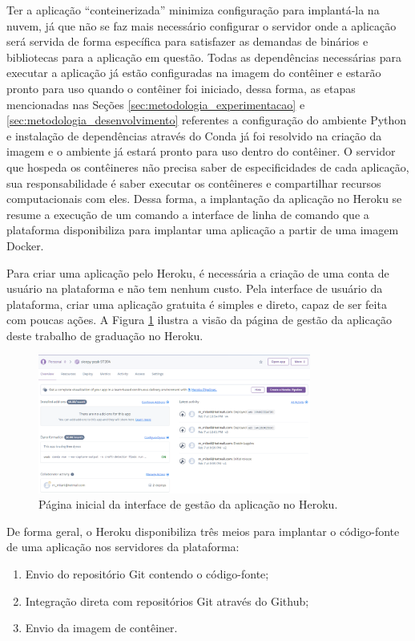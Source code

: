 Ter a aplicação “conteinerizada” minimiza configuração para implantá-la na nuvem, já que não se faz mais necessário configurar o servidor 
onde a aplicação será servida de forma específica para satisfazer as demandas de binários e bibliotecas para a aplicação em questão. Todas as dependências necessárias para executar a aplicação já estão configuradas na imagem do contêiner e estarão pronto para uso quando o contêiner foi iniciado, dessa forma, 
as etapas mencionadas nas Seções \ref{sec:metodologia_experimentacao} e \ref{sec:metodologia_desenvolvimento} referentes a configuração do ambiente 
Python e instalação de dependências através do Conda já foi resolvido na criação da imagem e o ambiente já estará pronto para uso dentro do contêiner. 
O servidor que hospeda os contêineres não precisa saber de especificidades de cada aplicação, sua responsabilidade é saber executar os contêineres e 
compartilhar recursos computacionais com eles. Dessa forma, a implantação da aplicação no Heroku se resume a execução de um comando a interface de linha 
de comando que a plataforma disponibiliza para implantar uma aplicação a partir de uma imagem Docker.

Para criar uma aplicação pelo Heroku, é necessária a criação de uma conta de usuário na plataforma e não tem nenhum custo. Pela interface de usuário da plataforma, criar uma aplicação gratuita é simples e direto, capaz de ser feita com poucas ações. A Figura \ref{fig:methodology_heroku_dashboard} ilustra a visão da página de gestão da aplicação deste trabalho de graduação no Heroku.

\begin{figure}
    \centering
    \includegraphics[width=0.8\textwidth]{figs/heroku-dashboard.png}
    \caption{Página inicial da interface de gestão da aplicação no Heroku.}
    \label{fig:methodology_heroku_dashboard}
\end{figure}

De forma geral, o Heroku disponibiliza três meios para implantar o código-fonte de uma aplicação nos servidores da plataforma:
\begin{enumerate}
    \item Envio do repositório Git contendo o código-fonte;
    \item Integração direta com repositórios Git através do Github;
    \item Envio da imagem de contêiner.
\end{enumerate}

